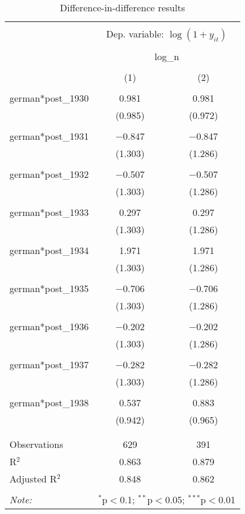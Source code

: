 
\begin{table}[!htbp] \centering 
  \caption{Difference-in-difference results} 
  \label{dif_table} 
\begin{tabular}{@{\extracolsep{5pt}}lcc} 
\\[-1.8ex]\hline 
\hline \\[-1.8ex] 
 & \multicolumn{2}{c}{Dep. variable: $\log(1 + y_{it})$} \\ 
\cline{2-3} 
\\[-1.8ex] & \multicolumn{2}{c}{log\_n} \\ 
\\[-1.8ex] & (1) & (2)\\ 
\hline \\[-1.8ex] 
 german*post_1930 & 0.981 & 0.981 \\ 
  & (0.985) & (0.972) \\ 
  & & \\ 
 german*post_1931 & $-$0.847 & $-$0.847 \\ 
  & (1.303) & (1.286) \\ 
  & & \\ 
 german*post_1932 & $-$0.507 & $-$0.507 \\ 
  & (1.303) & (1.286) \\ 
  & & \\ 
 german*post_1933 & 0.297 & 0.297 \\ 
  & (1.303) & (1.286) \\ 
  & & \\ 
 german*post_1934 & 1.971 & 1.971 \\ 
  & (1.303) & (1.286) \\ 
  & & \\ 
 german*post_1935 & $-$0.706 & $-$0.706 \\ 
  & (1.303) & (1.286) \\ 
  & & \\ 
 german*post_1936 & $-$0.202 & $-$0.202 \\ 
  & (1.303) & (1.286) \\ 
  & & \\ 
 german*post_1937 & $-$0.282 & $-$0.282 \\ 
  & (1.303) & (1.286) \\ 
  & & \\ 
 german*post_1938 & 0.537 & 0.883 \\ 
  & (0.942) & (0.965) \\ 
  & & \\ 
\hline \\[-1.8ex] 
Observations & 629 & 391 \\ 
R$^{2}$ & 0.863 & 0.879 \\ 
Adjusted R$^{2}$ & 0.848 & 0.862 \\ 
\hline 
\hline \\[-1.8ex] 
\textit{Note:}  & \multicolumn{2}{r}{$^{*}$p$<$0.1; $^{**}$p$<$0.05; $^{***}$p$<$0.01} \\ 
\end{tabular} 
\end{table} 
